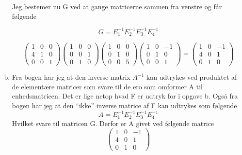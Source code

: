 \documentclass[12pt]{article}
\begin{document}
\begin{enumerate}[(a)]
Jeg bestemer nu G ved at gange matricerne sammen fra venstre og får følgende


$$G=E_{1}^{-1}E_{2}^{-1}E_{3}^{-1}E_{4}^{-1}$$

$$
\left(\begin{array}{ccc}
1&0&0
\\
4&1&0
\\
0&0&1
\end{array}\right)
\left(\begin{array}{ccc}
1&0&0
\\
0&0&1
\\
0&1&0
\end{array}\right) 
\left(\begin{array}{ccc}
1&0&0
\\
0&1&0
\\
0&0&5
\end{array}\right) 
\left(\begin{array}{ccc}
1&0&-1
\\
0&1&0
\\
0&0&1
\end{array}\right) = 
\left(\begin{array}{ccc}
1&0&-1
\\
4&0&1
\\
0&1&0
\end{array}\right)$$

\item
Fra bogen har jeg at den inverse matrix $A^{-1}$ kan udtrykes ved
produktet af de elementære matricer som svare til de ero som omformer A til
enhedsmatricen. Det er lige netop hvad F er udtryk for i opgave b. Også fra
bogen har jeg at den ``ikke'' inverse matrice af F kan udtrykes som følgende
$$A=E_{1}^{-1}E_{2}^{-1}E_{3}^{-1}E_{4}^{-1}$$ Hvilket svare til matricen G.
Derfor er A givet ved følgende matrice
$$\left(\begin{array}{ccc}
1&0&-1
\\
4&0&1
\\
0&1&0
\end{array}\right)$$


\end{enumerate}
\end{document}
